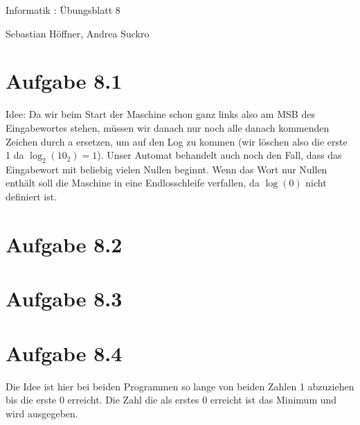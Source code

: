 \documentclass{article}
\begin{document}
\begin{center}
  \Large{Informatik \revD: Übungsblatt 8}

  \large{Sebastian Höffner, Andrea Suckro}
\end{center}



\section*{Aufgabe 8.1}
Idee: Da wir beim Start der Maschine schon ganz links also am MSB des Eingabewortes stehen, müssen wir danach nur noch alle danach kommenden Zeichen durch a ersetzen, um auf den Log zu kommen (wir löschen also die erste 1 da $\log_2(10_2) = 1$). Unser Automat behandelt auch noch den Fall, dass das Eingabewort mit beliebig vielen Nullen beginnt. Wenn das Wort nur Nullen enthält soll die Maschine in eine Endlosschleife verfallen, da $\log(0)$ nicht definiert ist.
\begin{center}
\end{center}

\section*{Aufgabe 8.2}
\section*{Aufgabe 8.3}
\section*{Aufgabe 8.4}
Die Idee ist hier bei beiden Programmen so lange von beiden Zahlen 1 abzuziehen bis die erste 0 erreicht. Die Zahl die als erstes 0 erreicht ist das Minimum und wird ausgegeben.
\end{document}

